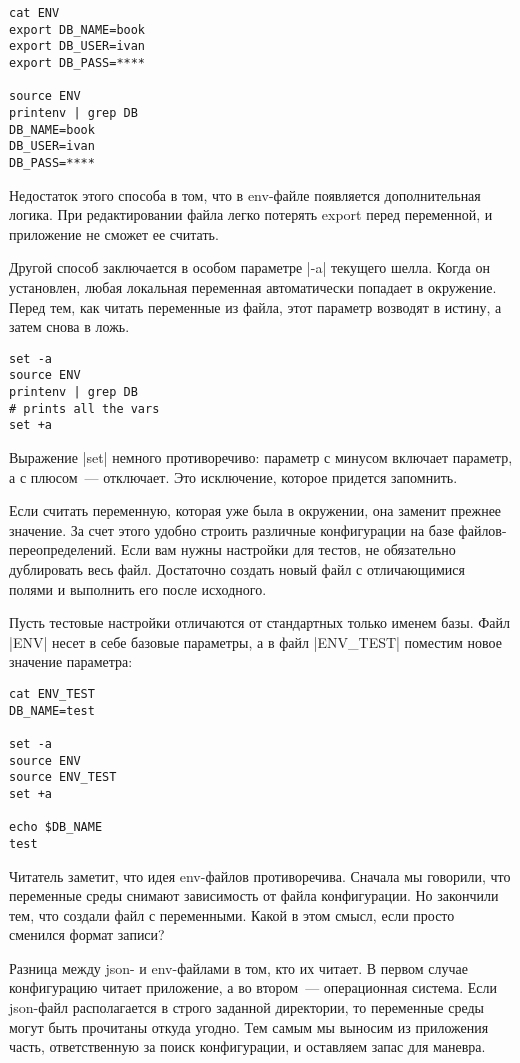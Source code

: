 \begin{verbatim}
cat ENV
export DB_NAME=book
export DB_USER=ivan
export DB_PASS=****

source ENV
printenv | grep DB
DB_NAME=book
DB_USER=ivan
DB_PASS=****
\end{verbatim}

Недостаток этого способа в том, что в env-файле появляется дополнительная
логика. При редактировании файла легко потерять export перед переменной, и
приложение не сможет ее считать.

Другой способ заключается в особом параметре \spverb|-a| текущего шелла. Когда он
установлен, любая локальная переменная автоматически попадает в окружение. Перед
тем, как читать переменные из файла, этот параметр возводят в истину, а затем
снова в ложь.

\begin{verbatim}
set -a
source ENV
printenv | grep DB
# prints all the vars
set +a
\end{verbatim}

Выражение \spverb|set| немного противоречиво: параметр с минусом включает параметр, а с
плюсом~--- отключает. Это исключение, которое придется запомнить.

Если считать переменную, которая уже была в окружении, она заменит прежнее
значение. За счет этого удобно строить различные конфигурации на базе
файлов-переопределений. Если вам нужны настройки для тестов, не обязательно
дублировать весь файл. Достаточно создать новый файл с отличающимися полями и
выполнить его после исходного.

Пусть тестовые настройки отличаются от стандартных только именем базы. Файл
\spverb|ENV| несет в себе базовые параметры, а в файл \spverb|ENV_TEST| поместим новое
значение параметра:

\begin{verbatim}
cat ENV_TEST
DB_NAME=test

set -a
source ENV
source ENV_TEST
set +a

echo $DB_NAME
test
\end{verbatim}

Читатель заметит, что идея env-файлов противоречива. Сначала мы говорили, что
переменные среды снимают зависимость от файла конфигурации. Но закончили тем,
что создали файл с переменными. Какой в этом смысл, если просто сменился формат
записи?

Разница между json- и env-файлами в том, кто их читает. В первом случае
конфигурацию читает приложение, а во втором~--- операционная система. Если
json-файл располагается в строго заданной директории, то переменные среды могут
быть прочитаны откуда угодно. Тем самым мы выносим из приложения часть,
ответственную за поиск конфигурации, и оставляем запас для маневра.

